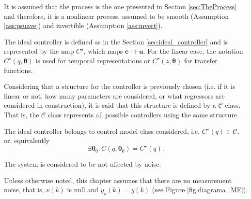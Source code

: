 \begin{assum}
   It is assumed that the process is the one presented in Section \ref{sec:TheProcess} and therefore, it is a nonlinear process, assumed to be smooth (Assumption \ref{ass:psuave}) and invertible (Assumption \ref{ass:invert}).
\end{assum}

\begin{defn}\label{def:idealControler}
   The ideal controller is defined as in the Section \ref{sec:ideal_controller} and is represented by the map $C^\star $, which maps $\tilde{\bm{e}}\mapsto \tilde{\bm{u}}$. For the linear case, the notation $C^\star(q,\bm{\theta})$ is used for temporal representations or $C^\star (z,\bm{\theta})$ for transfer functions.
\end{defn}

Considering that a structure for the controller is previously chosen (i.e. if it is linear or not, how many parameters are considered, or what regressors are considered in construction), it is said that this structure is defined by a $\mathscr{C}$ class. That is, the $\mathscr{C}$ class represents all possible controllers using the same structure.

\begin{assum}\label{ass:machedControl} %
   The ideal controller belongs to control model class considered, i.e. $C^\star(q) \in \mathscr{C}$, or, equivalently
   \begin{equation}
      \exists \bm{\theta}_0 : C(q,\bm{\theta}_0)=C^\star(q)
      \label{eq:assumpMatched}.
   \end{equation}
\end{assum}

\begin{assum}
   \label{ass:noiseFree} 
   The system is considered to be not affected by noise.
\end{assum}
Unless otherwise noted, this chapter assumes that there are no measurement noise, that is, $\nu(k)$ is null and $y_{\nu}(k) = y(k)$ (see Figure \ref{fig:diagrama_MF}).


